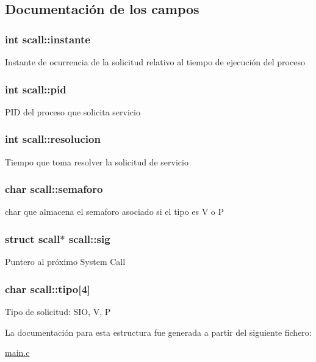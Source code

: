 \subsection{Documentación de los campos}
\hypertarget{structscall_a708ccbd2b58716d77b5dd6a1adabeea2}{
\subsubsection[{instante}]{\setlength{\rightskip}{0pt plus 5cm}int scall\-::instante}}\label{structscall_a708ccbd2b58716d77b5dd6a1adabeea2}
Instante de ocurrencia de la solicitud relativo al tiempo de ejecución del proceso \hypertarget{structscall_ab6a91a0001e173df71ec9262b306e852}{
\subsubsection[{pid}]{\setlength{\rightskip}{0pt plus 5cm}int scall\-::pid}}\label{structscall_ab6a91a0001e173df71ec9262b306e852}
P\-I\-D del proceso que solicita servicio \hypertarget{structscall_a5d5553c85657a4e8df8abee86a4817c0}{
\subsubsection[{resolucion}]{\setlength{\rightskip}{0pt plus 5cm}int scall\-::resolucion}}\label{structscall_a5d5553c85657a4e8df8abee86a4817c0}
Tiempo que toma resolver la solicitud de servicio \hypertarget{structscall_a67d17d647822c49caaad2f4b1953f2cd}{
\subsubsection[{semaforo}]{\setlength{\rightskip}{0pt plus 5cm}char scall\-::semaforo}}\label{structscall_a67d17d647822c49caaad2f4b1953f2cd}
char que almacena el semaforo asociado si el tipo es V o P \hypertarget{structscall_a7cce9b2960d49fc5047b164943a17849}{
\subsubsection[{sig}]{\setlength{\rightskip}{0pt plus 5cm}struct {\bf scall}$\ast$ scall\-::sig}}\label{structscall_a7cce9b2960d49fc5047b164943a17849}
Puntero al próximo System Call \hypertarget{structscall_a9f0b743b3846fe946abd6414035f91fb}{
\subsubsection[{tipo}]{\setlength{\rightskip}{0pt plus 5cm}char scall\-::tipo\mbox{[}4\mbox{]}}}\label{structscall_a9f0b743b3846fe946abd6414035f91fb}
Tipo de solicitud\-: S\-I\-O, V, P 

La documentación para esta estructura fue generada a partir del siguiente fichero\-:\begin{DoxyCompactItemize}
\item 
\hyperlink{main_8c}{main.\-c}\end{DoxyCompactItemize}
